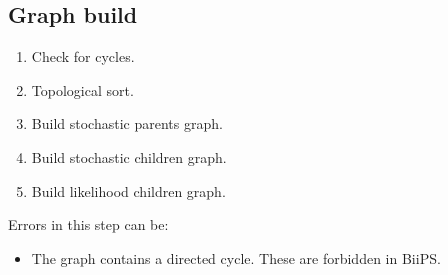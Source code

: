 \documentclass[11pt, a4paper, titlepage]{report}
\newcommand{\biips}{\textsf{BiiPS}}
\begin{document}
\subsection{Graph build}
 \begin{enumerate}
 \item Check for cycles.
 \item Topological sort.
 \item Build stochastic parents graph.
 \item Build stochastic children graph.
 \item Build likelihood children graph.
 \end{enumerate}
  Errors in this step can be:
  \begin{itemize}
  \item The graph contains a directed cycle.  These are forbidden
  in \biips.
  \end{itemize}
\end{document}
